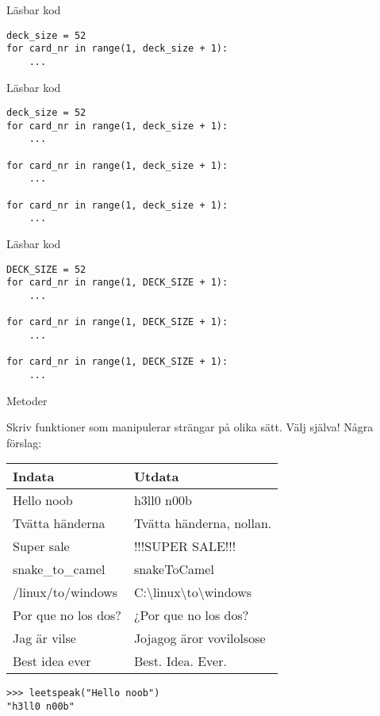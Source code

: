 \documentclass{beamer}
\begin{document}
  \begin{frame}[fragile]{Läsbar kod}

    \begin{verbatim}
deck_size = 52
for card_nr in range(1, deck_size + 1):
    ...
    \end{verbatim}

  \end{frame}

  \begin{frame}[fragile]{Läsbar kod}

    \begin{verbatim}
deck_size = 52
for card_nr in range(1, deck_size + 1):
    ...

for card_nr in range(1, deck_size + 1):
    ...

for card_nr in range(1, deck_size + 1):
    ...
    \end{verbatim}

  \end{frame}

  \begin{frame}[fragile]{Läsbar kod}

    \begin{verbatim}
DECK_SIZE = 52
for card_nr in range(1, DECK_SIZE + 1):
    ...

for card_nr in range(1, DECK_SIZE + 1):
    ...

for card_nr in range(1, DECK_SIZE + 1):
    ...
    \end{verbatim}

  \end{frame}

  \begin{frame}[fragile]{Metoder}

    Skriv funktioner som manipulerar strängar på olika sätt. Välj själva! \pause{}Några
    förslag:

    {
      \ttfamily
      \begin{tabular}{l l}
        Indata & Utdata \\\toprule
        Hello noob & h3ll0 n00b \\
        Tvätta händerna & Tvätta händerna, nollan. \\
        Super sale & !!!SUPER SALE!!! \\
        snake\_to\_camel & snakeToCamel \\
        /linux/to/windows & C:\textbackslash{}linux\textbackslash{}to\textbackslash{}windows \\
        Por que no los dos? & ¿Por que no los dos? \\
        Jag är vilse & Jojagog äror vovilolsose \\
        Best idea ever & Best. Idea. Ever. \\
      \end{tabular}
    }

    \pause{}

    \begin{verbatim}
>>> leetspeak("Hello noob")
"h3ll0 n00b"
    \end{verbatim}

  \end{frame}
\end{document}
